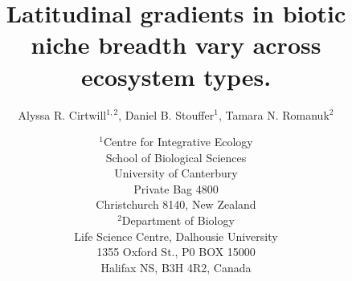 \documentclass[12pt]{article}
\begin{document}
\title{Latitudinal gradients in biotic niche breadth vary across ecosystem types.}
\author{Alyssa R. Cirtwill$^{1,2}$, Daniel B. Stouffer$^{1}$, Tamara N. Romanuk$^{2}$}
\date{\small$^1$Centre for Integrative Ecology\\School of Biological Sciences\\University of Canterbury\\
Private Bag 4800\\Christchurch 8140, New Zealand \\
\medskip$^2$Department of Biology\\
Life Science Centre, Dalhousie University\\1355 Oxford St., P0 BOX 15000\\
Halifax NS, B3H 4R2, Canada\\}

\maketitle
\baselineskip=8.5mm
 
\vspace{-0.3 in}
\end{document}
